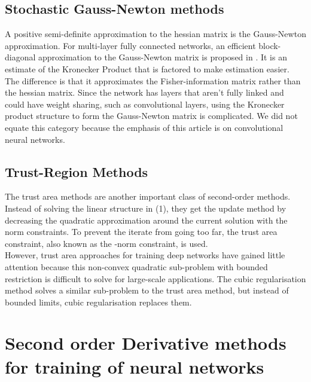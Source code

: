 \documentclass[journal]{IEEEtran}
\begin{document}
\subsection{Stochastic Gauss-Newton methods}
A positive semi-definite approximation to the hessian matrix is the Gauss-Newton approximation. For multi-layer fully connected networks, an efficient block-diagonal approximation to the Gauss-Newton matrix is proposed in \cite{botev2017practical}. It is an estimate of the Kronecker Product that is factored to make estimation easier\cite{martens2015optimizing}. The difference is that it approximates the Fisher-information matrix rather than the hessian matrix. Since the network has layers that aren't fully linked and could have weight sharing, such as convolutional layers, using the Kronecker product structure to form the Gauss-Newton matrix is complicated. We did not equate this category because the emphasis of this article is on convolutional neural networks.


\subsection{Trust-Region Methods}
The trust area methods are another important class of second-order methods. Instead of solving the linear structure in (1), they get the update method by decreasing the quadratic approximation around the current solution with the norm constraints. To prevent the iterate from going too far, the trust area constraint, also known as the -norm constraint, is used. \\
However, trust area approaches for training deep networks have gained little attention because this non-convex quadratic sub-problem with bounded restriction is difficult to solve for large-scale applications. The cubic regularisation method \cite{nesterov2006cubic} solves a similar sub-problem to the trust area method, but instead of bounded limits, cubic regularisation replaces them.

\section{Second order Derivative methods for training of neural networks}
\end{document}
